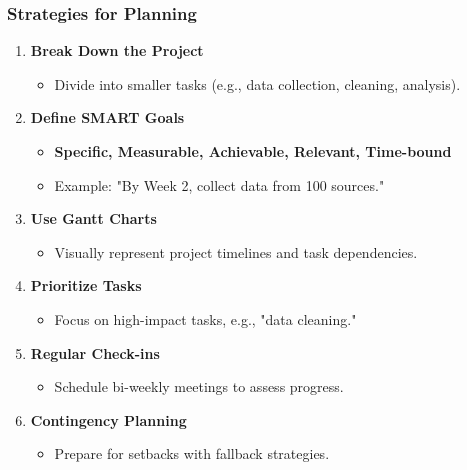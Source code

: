 \documentclass[aspectratio=169]{beamer}
\begin{document}
\begin{frame}[fragile]
  \frametitle{Strategies for Planning}
  \begin{enumerate}
    \item \textbf{Break Down the Project}
      \begin{itemize}
        \item Divide into smaller tasks (e.g., data collection, cleaning, analysis).
      \end{itemize}
      
    \item \textbf{Define SMART Goals}
      \begin{itemize}
        \item \textbf{Specific, Measurable, Achievable, Relevant, Time-bound}
        \item Example: "By Week 2, collect data from 100 sources."
      \end{itemize}

    \item \textbf{Use Gantt Charts}
      \begin{itemize}
        \item Visually represent project timelines and task dependencies.
      \end{itemize}

    \item \textbf{Prioritize Tasks}
      \begin{itemize}
        \item Focus on high-impact tasks, e.g., "data cleaning."
      \end{itemize}

    \item \textbf{Regular Check-ins}
      \begin{itemize}
        \item Schedule bi-weekly meetings to assess progress.
      \end{itemize}

    \item \textbf{Contingency Planning}
      \begin{itemize}
        \item Prepare for setbacks with fallback strategies.
      \end{itemize}
  \end{enumerate}
\end{frame}
\end{document}
